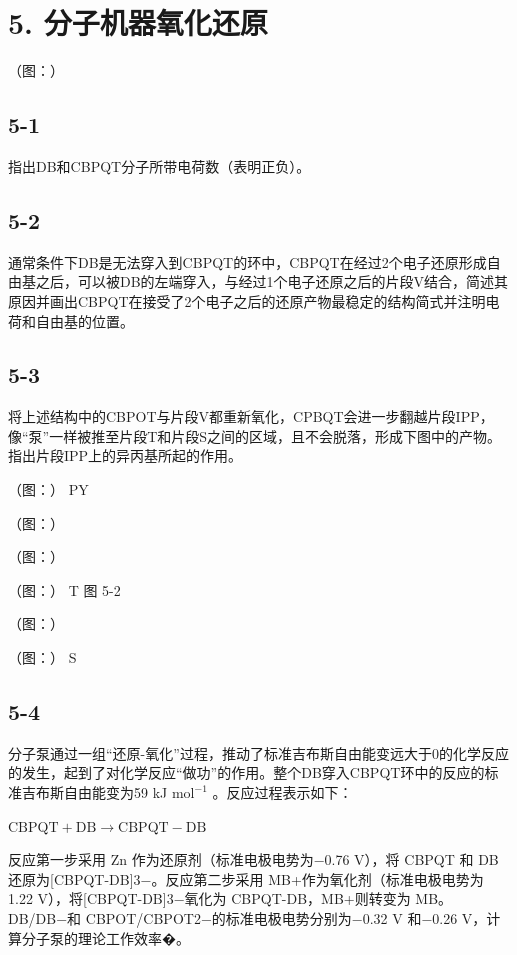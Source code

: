 \section*{5. 分子机器氧化还原}
（图：）

\subsection*{5-1}
指出DB和CBPQT分⼦所带电荷数（表明正负）。

\subsection*{5-2}
通常条件下DB是⽆法穿⼊到CBPQT的环中，CBPQT在经过2个电⼦还原形成⾃由基之后，可以被DB的左端穿⼊，与经过1个电⼦还原之后的⽚段V结合，简述其原因并画出CBPQT在接受了2个电⼦之后的还原产物最稳定的结构简式并注明电荷和⾃由基的位置。

\subsection*{5-3}
将上述结构中的CBPOT与⽚段V都重新氧化，CPBQT会进⼀步翻越⽚段IPP，像“泵”⼀样被推⾄⽚段T和⽚段S之间的区域，且不会脱落，形成下图中的产物。指出⽚段IPP上的异丙基所起的作⽤。

（图：）
PY

（图：）

（图：）

（图：）
T
图 5-2

（图：）

（图：）
S

\subsection*{5-4}
分⼦泵通过⼀组“还原-氧化”过程，推动了标准吉布斯⾃由能变远⼤于0的化学反应的发⽣，起到了对化学反应“做功”的作⽤。整个DB穿⼊CBPQT环中的反应的标准吉布斯⾃由能变为59 kJ $\mathrm { m o l ^ { - 1 } }$ 。反应过程表⽰如下：

$
\mathrm{CBPQT} + \mathrm{DB} \rightarrow \mathrm{CBPQT-DB}
$

反应第⼀步采⽤ Zn 作为还原剂（标准电极电势为−0.76 V），将 CBPQT 和 DB 还原为[CBPQT-DB]3−。反应第⼆步采⽤ MB+作为氧化剂（标准电极电势为 1.22 V），将[CBPQT-DB]3−氧化为 CBPQT-DB，MB+则转变为 MB。DB/DB−和 CBPOT/CBPOT2−的标准电极电势分别为−0.32 V 和−0.26 V，计算分⼦泵的理论⼯作效率�。
